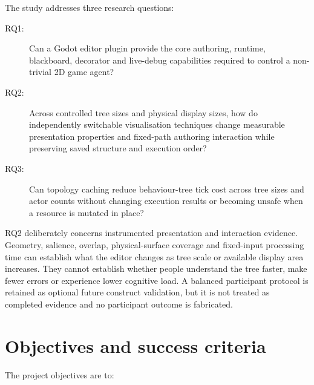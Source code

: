 The study addresses three research questions:

\begin{description}
    \item[RQ1:] Can a Godot editor plugin provide the core authoring, runtime, blackboard, decorator and live-debug capabilities required to control a non-trivial 2D game agent?
    \item[RQ2:] Across controlled tree sizes and physical display sizes, how do independently switchable visualisation techniques change measurable presentation properties and fixed-path authoring interaction while preserving saved structure and execution order?
    \item[RQ3:] Can topology caching reduce behaviour-tree tick cost across tree sizes and actor counts without changing execution results or becoming unsafe when a resource is mutated in place?
\end{description}

RQ2 deliberately concerns instrumented presentation and interaction evidence. Geometry, salience, overlap, physical-surface coverage and fixed-input processing time can establish what the editor changes as tree scale or available display area increases. They cannot establish whether people understand the tree faster, make fewer errors or experience lower cognitive load. A balanced participant protocol is retained as optional future construct validation, but it is not treated as completed evidence and no participant outcome is fabricated.

\section{Objectives and success criteria}

The project objectives are to:

